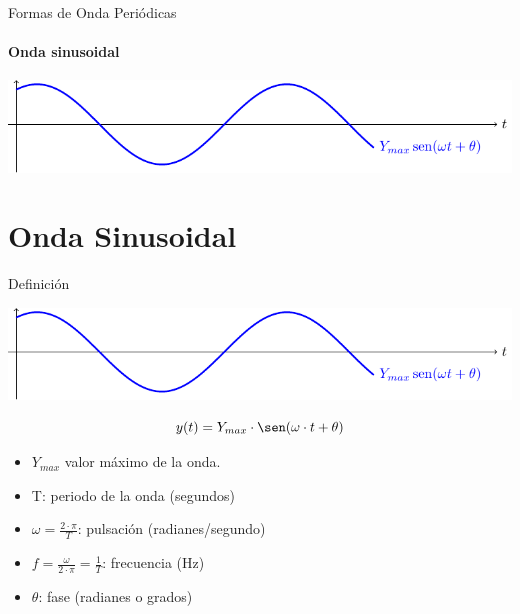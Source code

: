\documentclass[aspectratio=169, usenames,svgnames,dvipsnames]{beamer}
\begin{document}
\begin{frame}[label={sec:org38224fc}]{Formas de Onda Periódicas}
\framesubtitle{Onda sinusoidal}

\begin{center}
\includegraphics[width=.9\linewidth]{../figs/sin.pdf}
\end{center}
\end{frame}

\section{Onda Sinusoidal}
\label{sec:orge73065e}

\begin{frame}[label={sec:orgefcf41c}]{Definición}
\begin{center}
\includegraphics[width=.9\linewidth]{../figs/sin.pdf}
\end{center}


\[
y(t)=Y_{max}\cdot\sen(\omega\cdot t+\theta)
\]

\begin{itemize}
\item \(Y_{max}\) valor máximo de la onda.

\item T: periodo de la onda (segundos)

\item \(\omega=\frac{2\cdot\pi}{T}\): pulsación (radianes/segundo)

\item \(f=\frac{\omega}{2\cdot\pi}=\frac{1}{T}\): frecuencia (Hz)

\item \(\theta\): fase (radianes o grados)
\end{itemize}
\end{frame}
\end{document}
